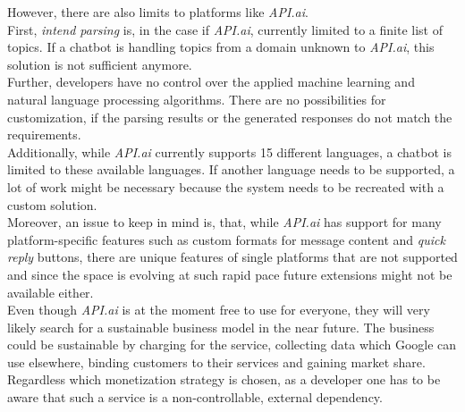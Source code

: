 However, there are also limits to platforms like \emph{API.ai}.
\\
First, \emph{intend parsing} is, in the case if \emph{API.ai}, currently limited to a finite list of topics.
If a chatbot is handling topics from a domain unknown to \emph{API.ai}, this solution is not sufficient anymore.
\\
Further, developers have no control over the applied machine learning and natural language processing algorithms.
There are no possibilities for customization, if the parsing results or the generated responses do not match the requirements.
\\
Additionally, while \emph{API.ai} currently supports 15 different languages, a chatbot is limited to these available languages.
If another language needs to be supported, a lot of work might be necessary because the system needs to be recreated with a custom solution.
\\
Moreover, an issue to keep in mind is, that, while \emph{API.ai} has support for many platform-specific features such as custom formats for message content and \emph{quick reply} buttons,
there are unique features of single platforms that are not supported
and since the space is evolving at such rapid pace future extensions might not be available either.
\\
Even though \emph{API.ai} is at the moment free to use for everyone,
they will very likely search for a sustainable business model in the near future.
The business could be sustainable by charging for the service, collecting data which Google can use elsewhere, binding customers to their services and gaining market share.
Regardless which monetization strategy is chosen, as a developer one has to be aware that such a service is a non-controllable, external dependency.
